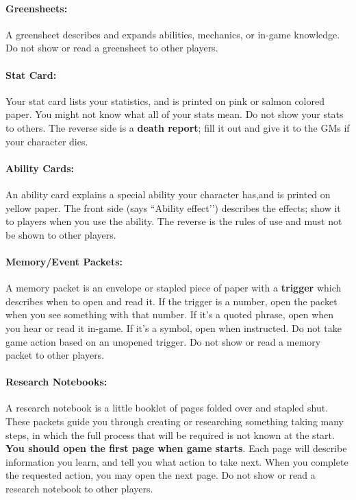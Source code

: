 \documentclass[sheet]{GL2020}
\begin{document}
\paragraph{Greensheets:} A greensheet describes and expands abilities, mechanics, or in-game knowledge.  Do not show or read a greensheet to other players.

\paragraph{Stat Card:} Your stat card lists your statistics, and is printed on pink or salmon colored paper.  You might not know what all of your stats mean.  Do not show your stats to others.  The reverse side is a {\bf death report}; fill it out and give it to the GMs if your character dies.

\paragraph{Ability Cards:} An ability card explains a special ability your character has,and is printed on yellow paper.  The front side (says ``Ability effect’’) describes the effects; show it to players when you use the ability.  The reverse is the rules of use and must not be shown to other players.

\paragraph{Memory/Event Packets:} A memory packet is an envelope or stapled piece of paper with a {\bf trigger} which describes when to open and read it.  If the trigger is a number, open the packet when you see something with that number.  If it's a quoted phrase, open when you hear or read it in-game.  If it's a symbol, open when instructed.  Do not take game action based on an unopened trigger.  Do not show or read a memory packet to other players.

\paragraph{Research Notebooks:} A research notebook is a little  booklet of pages folded over and stapled shut. These packets guide you through creating or researching something taking many steps, in which the full process that will be required is not known at the start. \textbf{You should open the first page when game starts}. Each page will describe information you learn, and tell you what action to take next. When you complete the requested action, you may open the next page. Do not show or read a research notebook to other players. 
\end{document}
